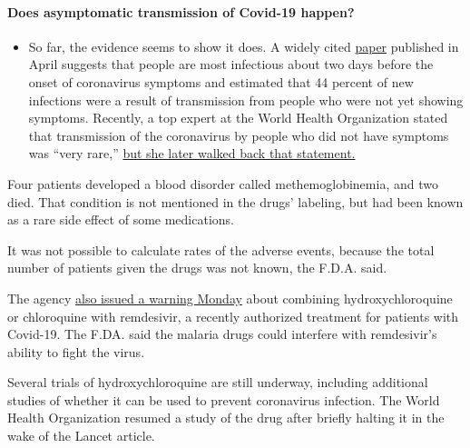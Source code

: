\begin{itemize}
{  \paragraph{Does asymptomatic transmission of Covid-19
  happen?}\label{does-asymptomatic-transmission-of-covid-19-happen}}

  \begin{itemize}
  \tightlist
  \item
    So far, the evidence seems to show it does. A widely cited
    \href{https://www.nature.com/articles/s41591-020-0869-5}{paper}
    published in April suggests that people are most infectious about
    two days before the onset of coronavirus symptoms and estimated that
    44 percent of new infections were a result of transmission from
    people who were not yet showing symptoms. Recently, a top expert at
    the World Health Organization stated that transmission of the
    coronavirus by people who did not have symptoms was ``very rare,''
    \href{https://www.nytimes.com/2020/06/09/world/coronavirus-updates.html?action=click\&pgtype=Article\&state=default\&region=MAIN_CONTENT_3\&context=storylines_faq\#link-1f302e21}{but
    she later walked back that statement.}
  \end{itemize}
\end{itemize}

Four patients developed a blood disorder called methemoglobinemia, and
two died. That condition is not mentioned in the drugs' labeling, but
had been known as a rare side effect of some medications.

It was not possible to calculate rates of the adverse events, because
the total number of patients given the drugs was not known, the F.D.A.
said.

The agency
\href{https://www.fda.gov/media/137566/download?utm_campaign=FDA\%20Warns\%20of\%20Newly\%20Discovered\%20Potential\%20Drug\%20Interaction\%20That\%20May\%20Reduce\%20Effectiveness\&utm_medium=email\&utm_source=Eloqua}{also
issued a warning Monday} about combining hydroxychloroquine or
chloroquine with remdesivir, a recently authorized treatment for
patients with Covid-19. The F.DA. said the malaria drugs could interfere
with remdesivir's ability to fight the virus.

Several trials of hydroxychloroquine are still underway, including
additional studies of whether it can be used to prevent coronavirus
infection. The World Health Organization resumed a study of the drug
after briefly halting it in the wake of the Lancet article.

